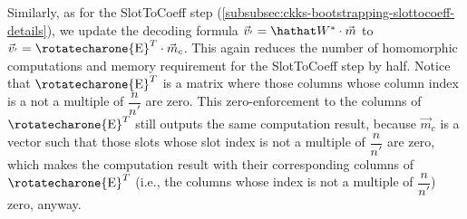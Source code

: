 Similarly, as for the \textsf{SlotToCoeff} step (\autoref{subsubsec:ckks-bootstrapping-slottocoeff-details}), we update the decoding formula $\vec{v}_{'} = \hathat W^* \cdot \vec{m}$ to $\vec{v}_{'} = \text{\rotatecharone{E}}^T \cdot \vec{m}_c$. This again reduces the number of homomorphic computations and memory requirement for the \textsf{SlotToCoeff} step by half. Notice that $\text{\rotatecharone{E}}^T$ is a matrix where those columns whose column index is a not a multiple of $\dfrac{n}{n'}$ are zero. This zero-enforcement to the columns of $\text{\rotatecharone{E}}^T$ still outputs the same computation result, because $\vec{m}_c$ is a vector such that those slots whose slot index is not a multiple of $\dfrac{n}{n'}$ are zero, which makes the computation result with their corresponding columns of $\text{\rotatecharone{E}}^T$ (i.e., the columns whose index is not a multiple of $\dfrac{n}{n'}$) zero, anyway.


